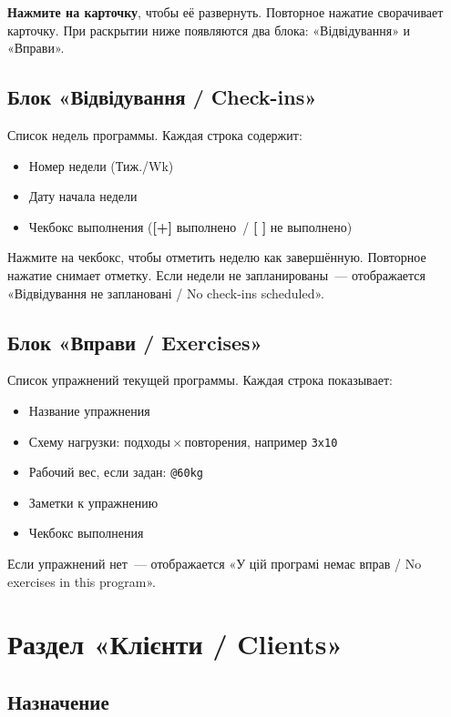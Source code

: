 \documentclass[12pt,a4paper]{article}
\begin{document}
\textbf{Нажмите на карточку}, чтобы её развернуть.
Повторное нажатие сворачивает карточку.
При раскрытии ниже появляются два блока: «Відвідування» и «Вправи».

\subsection{Блок «Відвідування / Check-ins»}

Список недель программы. Каждая строка содержит:
\begin{itemize}
  \item Номер недели (Тиж./Wk)
  \item Дату начала недели
  \item Чекбокс выполнения (\textbf{[+]} выполнено~/ \textbf{[ ]} не выполнено)
\end{itemize}

Нажмите на чекбокс, чтобы отметить неделю как завершённую.
Повторное нажатие снимает отметку. Если недели не запланированы~---
отображается «Відвідування не заплановані / No check-ins scheduled».

\subsection{Блок «Вправи / Exercises»}

Список упражнений текущей программы. Каждая строка показывает:
\begin{itemize}
  \item Название упражнения
  \item Схему нагрузки: подходы\,$\times$\,повторения,
    например \texttt{3x10}
  \item Рабочий вес, если задан: \texttt{@60kg}
  \item Заметки к упражнению
  \item Чекбокс выполнения
\end{itemize}

Если упражнений нет~--- отображается «У цій програмі немає вправ /
No exercises in this program».

\section{Раздел «Клієнти / Clients»}

\subsection{Назначение}
\end{document}
